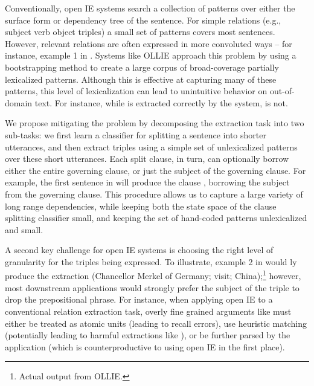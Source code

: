 Conventionally, open IE systems search a collection of patterns over either
  the surface form or dependency tree of the sentence.
For simple relations (e.g., subject verb object triples) a small set of
  patterns covers most sentences.
However, relevant relations are often expressed in more convoluted
  ways -- for instance, example 1 in .
Systems like OLLIE \cite{key:2012mausam-ollie} approach this problem by 
  using a bootstrapping method to create a large corpus of broad-coverage
  partially lexicalized patterns.
Although this is effective at capturing many of these patterns,
  this level of lexicalization can lead to unintuitive behavior on 
  out-of-domain text.
For instance, while  is extracted correctly by
  the system,  is not.

We propose mitigating the problem by decomposing the extraction task into
  two sub-tasks:
  we first learn a classifier for splitting a sentence into shorter
  utterances, and then extract triples using a simple set of
  unlexicalized patterns over these short utterances.
Each split clause, in turn, can optionally borrow either the entire
  governing clause, or just the subject of the governing clause.
For example, the first sentence in  will produce the
  clause , borrowing the subject
   from the governing clause.
This procedure allows us to capture a large variety of long range 
  dependencies, while keeping both the state space of the clause splitting
  classifier small, and keeping the set of hand-coded patterns unlexicalized
  and small.

A second key challenge for open IE systems is choosing the right level of
  granularity for the triples being expressed.
To illustrate, example 2 in  would \naive ly produce
  the extraction (Chancellor Merkel of Germany; visit; China);\footnote{
    Actual output from OLLIE.
  }
  however, most downstream applications would strongly prefer the subject
  of the triple to drop the prepositional phrase.
For instance, when applying open IE to a conventional relation extraction
  task, overly fine grained arguments like 
  must either be treated as atomic units (leading to recall errors),
  use heuristic matching (potentially leading to harmful extractions
  like ), or be further parsed by the application
  (which is counterproductive to using open IE in the first place).
  
